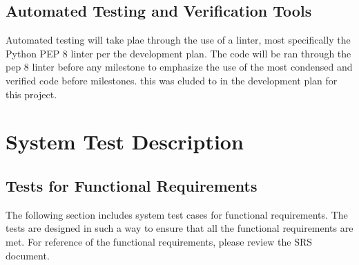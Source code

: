 \documentclass[12pt, titlepage]{article}
\begin{document}
\subsection{Automated Testing and Verification Tools}

Automated testing will take plae through the use of a linter, most specifically the Python
PEP 8 linter per the development plan. The code will be ran through the pep 8 linter before
any milestone to emphasize the use of the most condensed and verified code before milestones.
this was eluded to in the development plan for this project.


\section{System Test Description}
	
\subsection{Tests for Functional Requirements}

The following section includes system test cases for functional requirements.
The tests are designed in such a way to ensure that all the functional requirements are met.
For reference of the functional requirements, please review the SRS document.
\end{document}
